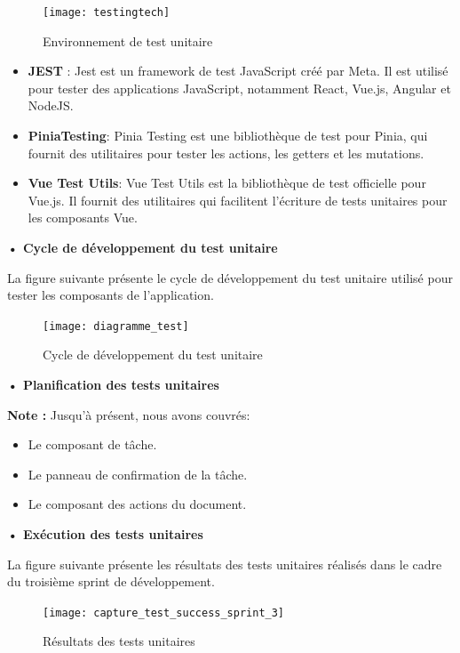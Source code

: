 \begin{figure}[H]
  \centering
  \texttt{[image: testingtech]}
  \caption{Environnement de test unitaire}
  \label{fig:environnementdetestunitaire}
\end{figure}
\begin{itemize}
  \item \textbf{JEST} : Jest est un framework de test JavaScript créé par Meta. Il est utilisé pour tester des applications JavaScript, notamment React, Vue.js, Angular et NodeJS.
  \item \textbf{PiniaTesting}: Pinia Testing est une bibliothèque de test pour Pinia, qui fournit des utilitaires pour tester les actions, les getters et les mutations.
  \item \textbf{Vue Test Utils}: Vue Test Utils est la bibliothèque de test officielle pour Vue.js. Il fournit des utilitaires qui facilitent l'écriture de tests unitaires pour les composants Vue.
\end{itemize}


\textbf{•	Cycle de développement du test unitaire}

La figure suivante présente le cycle de développement du test unitaire utilisé pour tester les composants de l'application.

\begin{figure}[H]
  \centering
  \texttt{[image: diagramme\_test]}
  \caption{Cycle de développement du test unitaire}
  \label{fig:cyclededveloppementdutestunitaire}
\end{figure}

\textbf{•	Planification des tests unitaires}

\textbf{Note : } Jusqu'à présent, nous avons couvrés:
\begin{itemize}
  \item Le composant de tâche.
  \item Le panneau de confirmation de la tâche.
  \item Le composant des actions du document.
\end{itemize}

\textbf{•	Exécution des tests unitaires}

La figure suivante présente les résultats des tests unitaires réalisés dans le cadre du troisième sprint de développement.

\begin{figure}[H]
  \centering
  \texttt{[image: capture\_test\_success\_sprint\_3]}
  \caption{Résultats des tests unitaires}
  \label{fig:resultatstestunitaire}
\end{figure}

